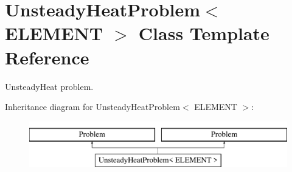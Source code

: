 \hypertarget{classUnsteadyHeatProblem}{}\section{Unsteady\+Heat\+Problem$<$ E\+L\+E\+M\+E\+NT $>$ Class Template Reference}
\label{classUnsteadyHeatProblem}


Unsteady\+Heat problem.  


Inheritance diagram for Unsteady\+Heat\+Problem$<$ E\+L\+E\+M\+E\+NT $>$\+:\begin{figure}[H]
\begin{center}
\leavevmode
\includegraphics[height=2.000000cm]{classUnsteadyHeatProblem}
\end{center}
\end{figure}
